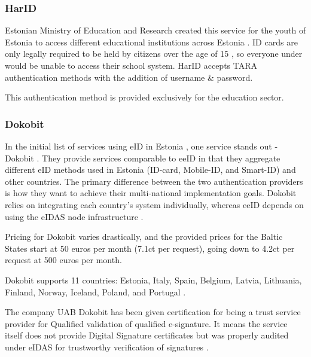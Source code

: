 \subsubsection{HarID}

Estonian Ministry of Education and Research created this service for the youth of Estonia to access different educational institutions across Estonia \cite{harid}. ID cards are only legally required to be held by citizens over the age of 15 \cite{eelaw-idcard}, so everyone under would be unable to access their school system. HarID accepts TARA authentication methods with the addition of {username \& password}.

This authentication method is provided exclusively for the education sector.

\subsubsection{Dokobit}

In the initial list of services using eID in Estonia \cite{ut-eidinestonia}, one service stands out - Dokobit \cite{dokobit}. They provide services comparable to eeID in that they aggregate different eID methods used in Estonia (ID-card, Mobile-ID, and Smart-ID) and other countries. The primary difference between the two authentication providers is how they want to achieve their multi-national implementation goals. Dokobit relies on integrating each country's system individually, whereas eeID depends on using the eIDAS node infrastructure \cite{eeid}.

Pricing for Dokobit varies drastically, and the provided prices for the Baltic States \cite{dokobit-pricing} start at 50 euros per month (7.1ct per request), going down to 4.2ct per request at 500 euros per month.

Dokobit supports 11 countries: Estonia, Italy, Spain, Belgium, Latvia, Lithuania, Finland, Norway, Iceland, Poland, and Portugal \cite{dokobit}.

The company UAB Dokobit has been given certification for being a trust service provider for Qualified validation of qualified e-signature. It means the service itself does not provide Digital Signature certificates but was properly audited under eIDAS for trustworthy verification of signatures \cite{eu-trustservices}.


